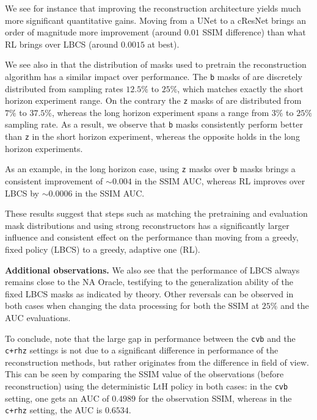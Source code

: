 We see for instance that improving the reconstruction architecture yields much more significant quantitative gains. Moving from a UNet to a cResNet brings an order of magnitude more improvement (around $0.01$ SSIM difference) than what RL brings over LBCS (around $0.0015$ at best). 

We see also in  that the distribution of masks used to pretrain the reconstruction algorithm has a similar impact over performance. The \texttt{b} masks of \citet{bakker2020experimental} are discretely distributed from sampling rates $12.5\%$ to $25\%$, which matches exactly the short horizon experiment range. On the contrary the \texttt{z} masks of \citet{zhang2019reducing} are distributed from $7\%$ to $37.5\%$, whereas the long horizon experiment spans a range from $3\%$ to $25\%$ sampling rate. As a result, we observe that \texttt{b} masks consistently perform better than \texttt{z} in the short horizon experiment, whereas the opposite holds in the long horizon experiments. 

As an example, in the long horizon case, using \texttt{z} masks over \texttt{b} masks brings a consistent improvement of $\sim 0.004$ in the SSIM AUC, whereas RL improves over LBCS by $\sim 0.0006$ in the SSIM AUC. 

\begin{extremark}
    These results suggest that steps such as matching the pretraining and evaluation mask distributions and using strong reconstructors has a significantly larger influence and consistent effect on the performance than moving from a greedy, fixed policy (LBCS) to a greedy, adaptive one (RL).
\end{extremark}

\textbf{Additional observations.} We also see that the performance of LBCS always remains close to the NA Oracle, testifying to the generalization ability of the fixed LBCS masks as indicated by theory. Other reversals can be observed in both cases when changing the data processing for both the SSIM at $25\%$ and the AUC evaluations.

To conclude, note that the large gap in performance between the \texttt{cvb} and the \texttt{c+rhz} settings is not due to a significant difference in performance of the reconstruction methods, but rather originates from the difference in field of view. This can be seen by comparing the SSIM value of the observations (before reconstruction) using the deterministic LtH policy in both cases: in the \texttt{cvb} setting, one gets an AUC of $0.4989$ for the observation SSIM, whereas in the \texttt{c+rhz} setting, the AUC is $0.6534$.


